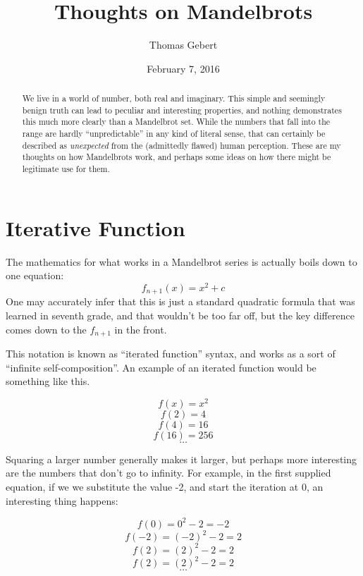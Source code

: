 \documentclass{article}
\author{Thomas Gebert}
\title{Thoughts on Mandelbrots}
\date{February 7, 2016}
\begin{document}
\maketitle

\tableofcontents

\pagebreak

\begin{abstract}
  We live in a world of number, both real and imaginary. This simple and seemingly benign truth can lead to peculiar and interesting properties, and nothing demonstrates this much more clearly than a Mandelbrot set.  While the numbers that fall into the range are hardly ``unpredictable'' in any kind of literal sense, that can certainly be described as \textit{unexpected} from the (admittedly flawed) human perception.  These are my thoughts on how Mandelbrots work, and perhaps some ideas on how there might be legitimate use for them. 
\end{abstract}

\section{Iterative Function}
The mathematics for what works in a Mandelbrot series is actually boils down to one equation:
\begin{equation}
  f_{n + 1}\left(x\right) = x^2 + c
\end{equation}
One may accurately infer that this is just a standard quadratic formula that was learned in seventh grade, and that wouldn't be too far off, but the key difference comes down to the $ f_{n + 1} $ in the front.

This notation is known as ``iterated function'' syntax, and works as a sort of ``infinite self-composition''.  An example of an iterated function would be something like this.

$$ f\left(x\right) = x^2$$
$$ f\left(2\right) = 4$$
$$ f\left(4\right) = 16$$
$$ f\left(16\right) = 256$$
$$ \ldots $$

Squaring a larger number generally makes it larger, but perhaps more interesting are the numbers that don't go to infinity. For example, in the first supplied equation, if we we substitute the value -2, and start the iteration at 0, an interesting thing happens:

$$ f\left(0\right) = 0^2 - 2 = -2$$
$$ f\left(-2\right) = \left(-2\right)^2 - 2 = 2$$
$$ f\left(2\right) = \left(2\right)^2 - 2 = 2$$
$$ f\left(2\right) = \left(2\right)^2 - 2 = 2$$
$$ \ldots $$
\end{document}
